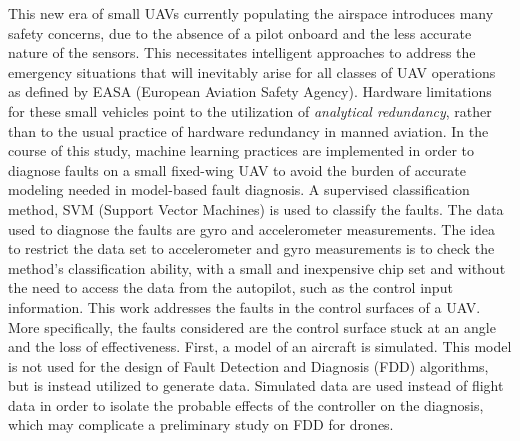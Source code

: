 % 
% 
%

This new era of small UAVs currently populating the airspace introduces many safety concerns, due to the absence of a pilot onboard and the less accurate nature of the sensors. 
This necessitates intelligent approaches to address the emergency situations that will inevitably arise for all classes of UAV operations as defined by EASA (European Aviation Safety Agency). 
Hardware limitations for these small vehicles point to the utilization of \emph{analytical redundancy}, rather than to the usual practice of hardware redundancy in manned aviation. 
In the course of this study, machine learning practices are implemented in order to diagnose faults on a small fixed-wing UAV to avoid the burden of accurate modeling needed in model-based fault diagnosis. 
A supervised classification method, SVM (Support Vector Machines) is used to classify the faults. 
The data used to diagnose the faults are gyro and accelerometer measurements. 
The idea to restrict the data set to accelerometer and gyro measurements is to check the method's classification ability, with a small and inexpensive chip set and without the need to access the data from the autopilot, such as the control input information. 
This work addresses the faults in the control surfaces of a UAV. 
More specifically, the faults considered are the control surface stuck at an angle and the loss of effectiveness. 
First, a model of an aircraft is simulated. This model is not used for the design of Fault Detection and Diagnosis (FDD) algorithms, but is instead utilized to generate data. 
Simulated data are used instead of flight data in order to isolate the probable effects of the controller on the diagnosis, which may complicate a preliminary study on FDD for drones.
